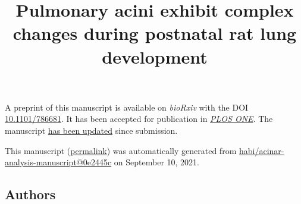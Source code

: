 \documentclass[
  american,
]{article}
\title{Pulmonary acini exhibit complex changes during postnatal rat lung development}
\author{}
\date{}
\begin{document}
\maketitle

A preprint of this manuscript is available on \emph{bioRxiv} with the DOI \href{https://doi.org/10.1101/786681}{10.1101/786681}.
It has been accepted for publication in \href{https://journals.plos.org/plosone/}{\emph{PLOS ONE}}.
The manuscript \href{https://github.com/habi/acinar-analysis-manuscript/compare/5e778036e316c47b8bac4ce50086b191a7e3707a...0e2445c24e13ea304a7439efa969e7a0fc2309cd}{has been updated} since submission.

This manuscript
(\href{https://habi.github.io/acinar-analysis-manuscript/v/0e2445c24e13ea304a7439efa969e7a0fc2309cd/}{permalink})
was automatically generated
from \href{https://github.com/habi/acinar-analysis-manuscript/tree/0e2445c24e13ea304a7439efa969e7a0fc2309cd}{habi/acinar-analysis-manuscript@0e2445c}
on September 10, 2021.

\hypertarget{authors}{%
\subsection{Authors}\label{authors}}
\end{document}
